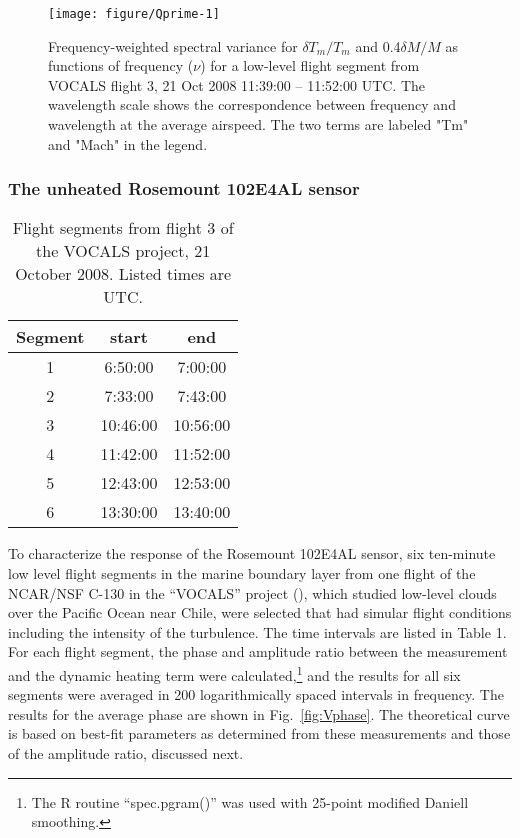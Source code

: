 \documentclass[11pt,twoside,american,12pt,twoside,american]{article}\usepackage[]{graphicx}\usepackage[]{color}
\makeatletter
\def\maxwidth{ %
  \ifdim\Gin@nat@width>\linewidth
    \linewidth
  \else
    \Gin@nat@width
  \fi
}
\newenvironment{knitrout}{}{} %
\providecommand{\tabularnewline}{\\}
\makeatother
\begin{document}
\begin{knitrout}
\color{fgcolor}\begin{figure}[t]

{\centering \texttt{[image: figure/Qprime-1]} 

}

\caption[Frequency-weighted spectral variance for $\delta T_m/T_m$ and 0.4$\delta M/M$ as functions of frequency ($\nu$) for a low-level flight segment from VOCALS flight 3, 21 Oct 2008 11:39:00 -- 11:52:00 UTC]{Frequency-weighted spectral variance for $\delta T_m/T_m$ and 0.4$\delta M/M$ as functions of frequency ($\nu$) for a low-level flight segment from VOCALS flight 3, 21 Oct 2008 11:39:00 -- 11:52:00 UTC. The wavelength scale shows the correspondence between frequency and wavelength at the average airspeed. The two terms are labeled "Tm" and "Mach" in the legend.}\label{fig:Qprime}
\end{figure}


\end{knitrout}



\subsubsection{The unheated Rosemount 102E4AL sensor\label{subsec:The-unheated-Rosemount}}

\begin{table}[H]
\begin{centering}
\begin{tabular}{|c|c|c|}
\hline 
Segment &
start &
end\tabularnewline
\hline 
\hline 
1 &
6:50:00 &
7:00:00\tabularnewline
\hline 
2 &
7:33:00 &
7:43:00\tabularnewline
\hline 
3 &
10:46:00 &
10:56:00\tabularnewline
\hline 
4 &
11:42:00 &
11:52:00\tabularnewline
\hline 
5 &
12:43:00 &
12:53:00\tabularnewline
\hline 
6 &
13:30:00 &
13:40:00\tabularnewline
\hline 
\end{tabular}
\par\end{centering}
\caption{Flight segments from flight 3 of the VOCALS project, 21 October 2008.
Listed times are UTC.}
\end{table}

To characterize the response of the Rosemount 102E4AL sensor, six
ten-minute low level flight segments in the marine boundary layer
from one flight of the NCAR/NSF C-130 in the ``VOCALS'' project
(\citet{wood2011vamos}), which studied low-level clouds over the
Pacific Ocean near Chile, were selected that had simular flight conditions
including the intensity of the turbulence. The time intervals are
listed in Table 1. For each flight segment, the phase and amplitude
ratio between the measurement and the dynamic heating term were calculated,\footnote{The R routine ``spec.pgram()'' was used with 25-point modified Daniell
smoothing.} and the results for all six segments were averaged in 200
logarithmically spaced intervals in frequency. The results for the
average phase are shown in Fig.~\ref{fig:Vphase}. The theoretical
curve is based on best-fit parameters as determined from these measurements
and those of the amplitude ratio, discussed next.
\end{document}
